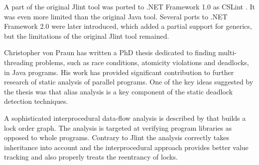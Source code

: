 A part of the original Jlint tool was ported to .NET Framework 1.0 as CSLint \citep{CSLint}. It was even more limited than the original Java tool. Several ports to .NET Framework 2.0 were later introduced, which added a partial support for generics, but the limitations of the original Jlint tool remained.

Christopher von Praun has written a PhD thesis \citep{Praun2004} dedicated to finding multi-threading problems, such as race conditions, atomicity violations and deadlocks, in Java programs. His work has provided significant contribution to further research of static analysis of parallel programs. One of the key ideas suggested by the thesis was that alias analysis is a key component of the static deadlock detection techniques.

A sophisticated interprocedural data-flow analysis is described by \citet{Williams2005} that builds a lock order graph. The analysis is targeted at verifying program libraries as opposed to whole programs. Contrary to Jlint the analysis correctly takes inheritance into account and the interprocedural approach provides better value tracking and also properly treats the reentrancy of locks.

